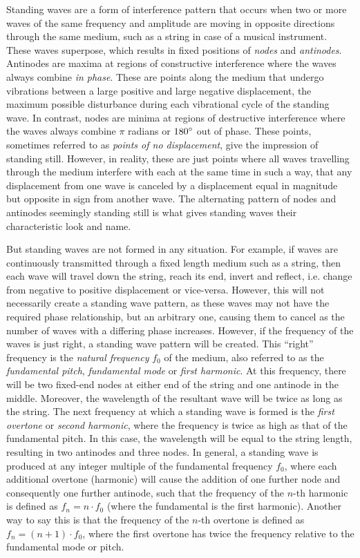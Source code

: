 \pagebreak


Standing waves are a form of interference pattern that occurs when two or more waves of the same frequency and amplitude are moving in opposite directions through the same medium, such as a string in case of a musical instrument. These waves superpose, which results in fixed positions of \emph{nodes} and \emph{antinodes}. Antinodes are maxima at regions of constructive interference where the waves always combine \emph{in phase}. These are points along the medium that undergo vibrations between a large positive and large negative displacement, the maximum possible disturbance during each vibrational cycle of the standing wave. In contrast, nodes are minima at regions of destructive interference where the waves always combine $\pi$ radians or $180\degree$ out of phase. These points, sometimes referred to as \emph{points of no displacement}, give the impression of standing still. However, in reality, these are just points where all waves travelling through the medium interfere with each at the same time in such a way, that any displacement from one wave is canceled by a displacement equal in magnitude but opposite in sign from another wave. The alternating pattern of nodes and antinodes seemingly standing still is what gives standing waves their characteristic look and name.

But standing waves are not formed in any situation. For example, if waves are continuously transmitted through a fixed length medium such as a string, then each wave will travel down the string, reach its end, invert and reflect, i.e. change from negative to positive displacement or vice-versa. However, this will not necessarily create a standing wave pattern, as these waves may not have the required phase relationship, but an arbitrary one, causing them to cancel as the number of waves with a differing phase increases. However, if the frequency of the waves is just right, a standing wave pattern will be created. This ``right'' frequency is the \emph{natural frequency} $f_0$ of the medium, also referred to as the \emph{fundamental pitch}, \emph{fundamental mode} or \emph{first harmonic}. At this frequency, there will be two fixed-end nodes at either end of the string and one antinode in the middle. Moreover, the wavelength of the resultant wave will be twice as long as the string. The next frequency at which a standing wave is formed is the \emph{first overtone} or \emph{second harmonic}, where the frequency is twice as high as that of the fundamental pitch. In this case, the wavelength will be equal to the string length, resulting in two antinodes and three nodes. In general, a standing wave is produced at any integer multiple of the fundamental frequency $f_0$, where each additional overtone (harmonic) will cause the addition of one further node and consequently one further antinode, such that the frequency of the $n$-th harmonic is defined as $f_n = n \cdot f_0$ (where the fundamental is the first harmonic). Another way to say this is that the frequency of the $n$-th overtone is defined as $f_n = (n + 1) \cdot f_0$, where the first overtone has twice the frequency relative to the fundamental mode or pitch.

